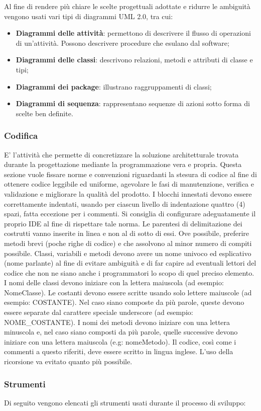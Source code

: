                 Al fine di rendere più chiare le scelte progettuali adottate e ridurre le ambiguità vengono usati vari tipi di diagrammi UML 2.0, tra cui:
                \begin{itemize}
                		\item{\textbf{Diagrammi delle attività}: permettono di descrivere il flusso di operazioni di un'attività. Possono descrivere procedure che esulano dal software;}
			\item{\textbf{Diagrammi delle classi}: descrivono relazioni, metodi e attributi di classe e tipi;}
			\item{\textbf{Diagrammi dei package}: illustrano raggruppamenti di classi;}
			\item{\textbf{Diagrammi di sequenza}: rappresentano sequenze di azioni sotto forma di scelte ben definite.}
                \end{itemize}
                
             \subsubsection{Codifica}
             E' l'attività che permette di concretizzare la soluzione architetturale trovata durante la progettazione mediante la programmazione vera e propria.
             Questa sezione vuole fissare norme e convenzioni riguardanti la stesura di codice al fine di ottenere codice leggibile ed uniforme, agevolare le fasi di manutenzione, verifica e validazione e migliorare la qualità del prodotto.
		I blocchi innestati devono essere correttamente indentati, usando per ciascun livello di indentazione quattro (4) spazi, fatta eccezione per i commenti. Si consiglia di configurare adeguatamente il proprio IDE al fine di rispettare tale norma.
		Le parentesi di delimitazione dei costrutti vanno inserite in linea e non al di sotto di essi.
		Ove possibile, preferire metodi brevi (poche righe di codice) e che assolvono al minor numero di compiti possibile.
		Classi, variabili e metodi devono avere un nome univoco ed esplicativo (nome parlante) al fine di evitare ambiguità e di far capire ad eventuali lettori del codice che non ne siano anche i programmatori lo scopo di quel preciso elemento.
		I nomi delle classi devono iniziare con la lettera maiuscola (ad esempio: NomeClasse).
		Le costanti devono essere scritte usando solo lettere maiuscole (ad esempio: COSTANTE). Nel caso siano composte da più parole, queste devono essere separate dal carattere speciale underscore (ad esempio: NOME\_COSTANTE).
		I nomi dei metodi devono iniziare con una lettera minuscola e, nel caso siano composti da più parole, quelle successive devono iniziare con una lettera maiuscola (e.g: nomeMetodo).
		Il codice, così come i commenti a questo riferiti, deve essere scritto in lingua inglese.
		L'uso della ricorsione va evitato quanto più possibile.
                
        \subsubsection{Strumenti}
        Di seguito vengono elencati gli strumenti usati durante il processo di sviluppo: